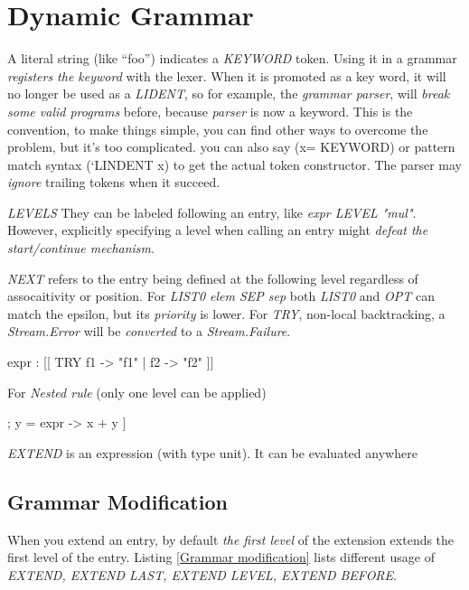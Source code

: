 \section{Dynamic Grammar}

A literal string (like ``foo'') indicates a \textit{KEYWORD}
token. Using it in a grammar \textit{registers the keyword} with the
lexer. When it is promoted as a key word, it will no longer be used as
a \textit{LIDENT}, so for example, the \textit{grammar parser}, will
\textit{break some valid programs} before, because \textit{parser} is
now a keyword. This is the convention, to make things simple, you can
find other ways to overcome the problem, but it's too complicated. you
can also say (x= KEYWORD) or pattern match syntax (`LINDENT x) to get
the actual token constructor. The parser may \textit{ignore} trailing
tokens when it succeed.

\textit{LEVELS}  They can be labeled following an entry, like \textit{expr
  LEVEL "mul"}. However, explicitly specifying a level when calling an
entry might \textit{defeat the start/continue mechanism}.

\textit{NEXT} refers to the entry being defined at the following level
regardless of assocaitivity or position.  For \textit{LIST0 elem SEP
  sep} both \textit{LIST0} and \textit{OPT} can match the epsilon, but
its \textit{priority} is lower.  For \textit{TRY}, non-local
backtracking, a \textit{Stream.Error} will be \textit{converted} to a
\textit{Stream.Failure}.


  \begin{ocamlcode}
    expr : [[ TRY f1 -> "f1" | f2 -> "f2" ]]
  \end{ocamlcode}
  
  For \textit{Nested rule} (only one level can be applied)
  
  \begin{ocamlcode}
    [x = expr ; ["+" | "plus" ]; y = expr -> x + y ]
  \end{ocamlcode}
  
  \textit{EXTEND} is an expression (with type unit). It can be
  evaluated anywhere

\subsection{Grammar Modification}

When you extend an entry, by default \textit{the first level} of the
extension extends the first level of the entry.  Listing \ref{Grammar
  modification} lists different usage of \textit{EXTEND, EXTEND LAST,
  EXTEND LEVEL, EXTEND BEFORE}.


